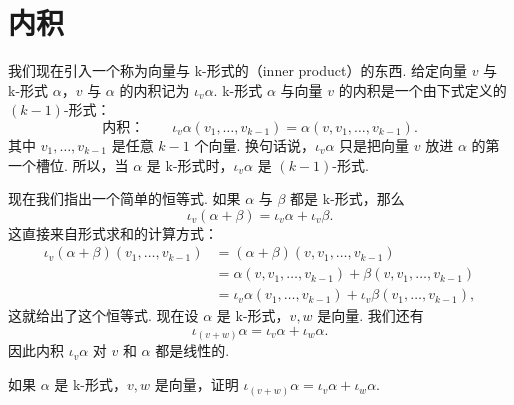 \section{内积}

我们现在引入一个称为向量与 k-形式的（inner product）的东西. 给定向量 $v$ 与 k-形式 $\alpha$，$v$ 与 $\alpha$ 的内积记为 $\iota_v\alpha$. k-形式 $\alpha$ 与向量 $v$ 的内积是一个由下式定义的 $(k-1)$-形式：
\[
\text{内积：}\qquad\iota_v\alpha(v_1,\ldots,v_{k-1})=\alpha(v,v_1,\ldots,v_{k-1}).
\]
其中 $v_1,\ldots,v_{k-1}$ 是任意 $k-1$ 个向量. 换句话说，$\iota_v\alpha$ 只是把向量 $v$ 放进 $\alpha$ 的第一个槽位. 所以，当 $\alpha$ 是 k-形式时，$\iota_v\alpha$ 是 $(k-1)$-形式.

现在我们指出一个简单的恒等式. 如果 $\alpha$ 与 $\beta$ 都是 k-形式，那么
\[
\iota_v(\alpha+\beta)=\iota_v\alpha+\iota_v\beta.
\]
这直接来自形式求和的计算方式：
\begin{align*}
\iota_v(\alpha+\beta)(v_1,\ldots,v_{k-1})
&=(\alpha+\beta)(v,v_1,\ldots,v_{k-1})\\
&=\alpha(v,v_1,\ldots,v_{k-1})+\beta(v,v_1,\ldots,v_{k-1})\\
&=\iota_v\alpha(v_1,\ldots,v_{k-1})+\iota_v\beta(v_1,\ldots,v_{k-1}),
\end{align*}
这就给出了这个恒等式. 现在设 $\alpha$ 是 k-形式，$v,w$ 是向量. 我们还有
\[
\iota_{(v+w)}\alpha=\iota_v\alpha+\iota_w\alpha.
\]
因此内积 $\iota_v\alpha$ 对 $v$ 和 $\alpha$ 都是线性的.

\begin{question}\label{q:3-21}
如果 $\alpha$ 是 k-形式，$v,w$ 是向量，证明 $\iota_{(v+w)}\alpha=\iota_v\alpha+\iota_w\alpha$.
\end{question}


